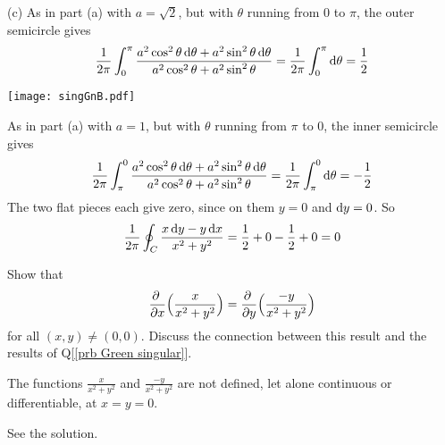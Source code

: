 \begin{solution}
(c)
As in part (a) with $a=\sqrt{2}$, but with $\theta$ running from $0$ to $\pi$, 
the outer semicircle gives 
\begin{equation*}
\frac{1}{2\pi}\int_0^{\pi} \frac{a^2\cos^2\theta\,\mathrm{d}\theta+a^2\sin^2\theta\,\mathrm{d}\theta}
             {a^2\cos^2\theta+a^2\sin^2\theta}
=\frac{1}{2\pi}\int_0^{\pi}\mathrm{d}\theta
=\frac{1}{2}
\end{equation*}
\begin{center}
       \texttt{[image: singGnB.pdf]}
\end{center}
As in part (a) with $a=1$, but with $\theta$ running from $\pi$ to $0$, 
the inner semicircle
gives 
\begin{equation*}
\frac{1}{2\pi}\int^0_{\pi} \frac{a^2\cos^2\theta\,\mathrm{d}\theta+a^2\sin^2\theta\,\mathrm{d}\theta}
             {a^2\cos^2\theta+a^2\sin^2\theta}
=\frac{1}{2\pi}\int^0_{\pi}\mathrm{d}\theta
=-\frac{1}{2}
\end{equation*}
The two flat pieces each give zero, since
on them $y=0$ and $\mathrm{d}y=0$. So 
\begin{equation*}
\frac{1}{2\pi}\oint_C \frac{x\,\mathrm{d}y-y\,\mathrm{d}x}{x^2+y^2}
=\frac{1}{2}+0-\frac{1}{2}+0=0
\end{equation*}


\end{solution}

\begin{question}
Show that
\begin{align*}
\pdiff{}{x}\Big( \frac{x}{x^2+y^2}\Big)
=\pdiff{}{y}\Big( \frac{-y}{x^2+y^2}\Big)
\end{align*}
for all $(x,y)\ne (0,0)$. Discuss the connection between this result and
the results of Q[\ref{prb Green singular}].
\end{question}

\begin{hint} 
The functions $\frac{x}{x^2+y^2}$
and $\frac{-y}{x^2+y^2}$ are not defined, let alone continuous or
differentiable, at $x=y=0$.
\end{hint}

\begin{answer} 
See the solution.
\end{answer}


